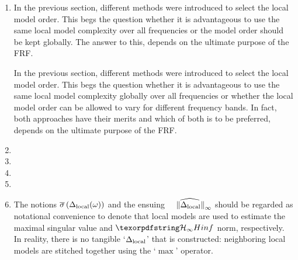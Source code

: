 \documentclass{responseletter}
\begin{document}
\begin{enumerate}
\item 
{}
\begin{oldquote}
In the previous section, different methods were introduced to select the local model order. 
This begs the question whether it is advantageous to use the same local model complexity over all frequencies or the model order should be kept globally. 
The answer to this, depends on the ultimate purpose of the \gls{FRF}.
\end{oldquote}
\begin{newquote}
In the previous section, different methods were introduced to select the local model order.
This begs the question whether it is advantageous to use the same local model complexity globally over all frequencies or whether the local model order can be allowed to vary for different frequency bands.
In fact, both approaches have their merits and which of both is to be preferred, depends on the ultimate purpose of the \gls{FRF}.
\end{newquote}

  \item 
   \replacedBy 

   \item 
   \replacedBy

   \item 
   \replacedBy

  \item
  \replacedBy

  \item
  \begin{newquote}
  \begin{remark}{4.3}
The notions $ \overline{\sigma} \left( \Delta_{\mathrm{local}}(\omega) \right) $ and the ensuing  $\widehat{\phantom{_\infty}\left\| \Delta_{\mathrm{local}} \right\|_{\infty}}$  should be regarded as notational convenience to denote that local models are used to estimate the maximal singular value and $\Hinf{}$ norm, respectively.
In reality, there is no tangible `$\Delta_{\mathrm{local}}$' that is constructed: neighboring local models are stitched together using the `$\max$' operator.
\end{remark}
  \end{newquote}


\end{enumerate}
\end{document}

